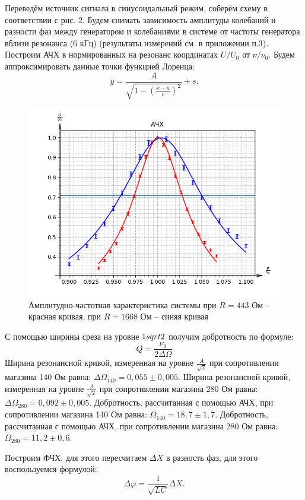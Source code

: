 \documentclass[a4paper,12pt]{extarticle}
\begin{document}
Переведём источник сигнала в синусоидальный режим, соберём схему в соответствии с рис. 2. Будем снимать зависимость амплитуды колебаний и разности фаз между генератором и колебаниями в системе от частоты генератора вблизи резонанса (6 кГц) (результаты измерений см. в приложении п.3). Построим АЧХ в нормированных на резонанс координатах $U/U_0$ от $\nu/\nu_0$. Будем аппроксимировать данные точки функцией Лоренца:
$$y = \frac{A}{\sqrt{1-(\frac{x-a}{c})^2}} + s.$$
\begin{figure}[h!]
    \centering
    \includegraphics[width=0.8\linewidth]{ACHH.png}
    \caption{Амплитудно-частотная характеристика системы при $R = 443$ Ом -- красная кривая, при $R = 1668$ Ом -- синяя кривая}
\end{figure}

С помощью ширины среза на уровне $1\\sqrt{2}$ получим добротность по формуле:
\begin{equation}
    Q = \frac{\nu_0}{2 \Delta \Omega}
\end{equation}
Ширина резонансной кривой, измеренная на уровне $\frac{A}{\sqrt{2}}$ при сопротивлении магазина 140 Ом равна: $\Delta \Omega_\text{140} = 0,055 \pm 0,005.$
Ширина резонансной кривой, измеренная на уровне $\frac{A}{\sqrt{2}}$ при сопротивлении магазина 280 Ом равна: $\Delta \Omega_\text{280} = 0,092 \pm 0,005.$
Добротность, рассчитанная с помощью АЧХ, при сопротивлении магазина 140 Ом равна: $\Omega_\text{140} = 18,7 \pm 1,7.$
Добротность, рассчитанная с помощью АЧХ, при сопротивлении магазина 280 Ом равна: $\Omega_\text{280} = 11,2 \pm 0,6.$

Построим ФЧХ, для этого пересчитаем $\Delta X$ в разность фаз, для этого воспользуемся формулой:
\begin{equation}
    \Delta \varphi = \frac{1}{\sqrt{LC}} \Delta X.
\end{equation}
\end{document}
